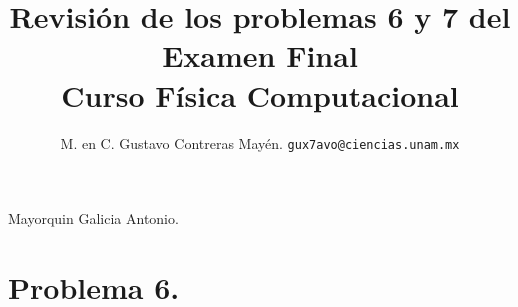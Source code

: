 

\author{M. en C. Gustavo Contreras Mayén. \texttt{gux7avo@ciencias.unam.mx}}
\title{\vspace*{-3cm}Revisión de los problemas 6 y 7 del Examen Final \\ {\large Curso Física Computacional}}
\date{ }


\maketitle
\fontsize{14}{14}\selectfont

\Large{Mayorquin Galicia Antonio.}

\section{Problema 6.}

